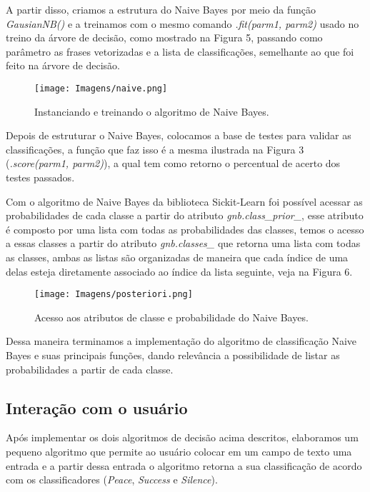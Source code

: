 \documentclass[preprint,12pt,times]{elsarticle}
\begin{document}
	A partir disso, criamos a estrutura do Naive Bayes por meio da função \textit{GausianNB()} e a treinamos com o mesmo comando \textit{.fit(parm1, parm2)} usado no treino da árvore de decisão, como mostrado na Figura 5, passando como parâmetro as frases vetorizadas e a lista de classificações, semelhante ao que foi feito na árvore de decisão.
	
	\begin{figure}[h]
		\centering\texttt{[image: Imagens/naive.png]}
		\caption{Instanciando e treinando o algoritmo de Naive Bayes.}
	\end{figure}
	
	Depois de estruturar o Naive Bayes, colocamos a base de testes para validar as classificações, a função que faz isso é a mesma ilustrada na Figura 3 (\textit{.score(parm1, parm2)}), a qual tem como retorno o percentual de acerto dos testes passados.
	
	Com o algoritmo de Naive Bayes da biblioteca Sickit-Learn foi possível acessar as probabilidades de cada classe a partir do atributo \textit{gnb.class\_prior\_}, esse atributo é composto por uma lista com todas as probabilidades das classes, temos o acesso a essas classes a partir do atributo \textit{gnb.classes\_} que retorna uma lista com todas as classes, ambas as listas são organizadas de maneira que cada índice de uma delas esteja diretamente associado ao índice da lista seguinte, veja na Figura 6.
	
	\begin{figure}[h]
		\centering\texttt{[image: Imagens/posteriori.png]}
		\caption{Acesso aos atributos de  classe e probabilidade do Naive Bayes.}
	\end{figure}
	
	Dessa maneira terminamos a implementação do algoritmo de classificação Naive Bayes  e suas principais funções, dando relevância a possibilidade de listar as probabilidades a partir de cada classe.
	
	\subsection{Interação com o usuário}
	Após implementar os dois algoritmos de decisão acima descritos, elaboramos um pequeno algoritmo que permite ao usuário colocar em um campo de texto uma entrada e a partir dessa entrada o algoritmo retorna a sua classificação de acordo com os classificadores (\textit{Peace}, \textit{Success} e \textit{Silence}).
	
\end{document}
